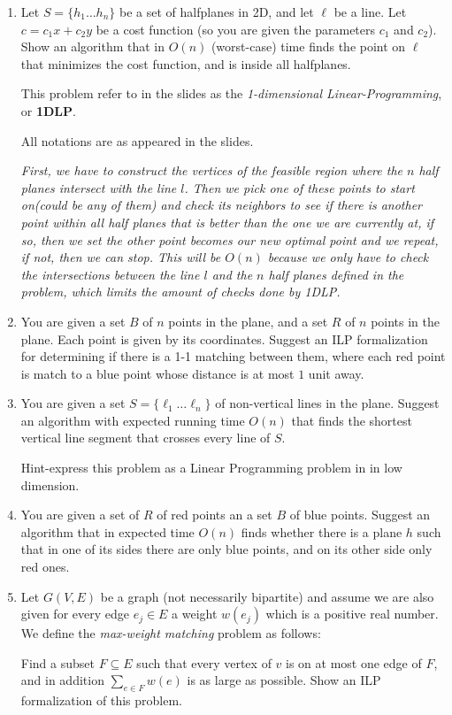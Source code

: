 \documentclass[11pt,epic,leqno,eepic,psfig,]{article}
\newcommand{\ans}[1]{{\color{brown}{\bf\Large Answer:} \sl  #1 \color{black}}}
\renewcommand{\i}{\item}
\begin{document}
\begin{enumerate}
\i Let $S=\{h_1\dots h_n\}$ be a set of halfplanes in 2D, and let $\ell$ be a line.
Let $c=c_1x+c_2y$ be a cost function (so you are given the parameters $c_1$ and $c_2$).
Show an algorithm that in $O(n)$ (worst-case) time finds the point on $\ell$ that minimizes the cost function, and is inside all halfplanes. 

This problem refer to in the slides as the {\em 1-dimensional Linear-Programming}, or  {\bf 1DLP}. 

All notations are as appeared in the slides. 

\ans{First, we have to construct the vertices of the feasible region where the $n$ half planes intersect with the line $l$. Then we pick one of these points to start on(could be any of them) and check its neighbors to see if there is another point within all half planes that is better than the one we are currently at, if so, then we set the other point becomes our new optimal point and we repeat, if not, then we can stop. This will be $O(n)$ because we only have to check the intersections between the line $l$ and the $n$ half planes defined in the problem, which limits the amount of checks done by 1DLP.}

\item You are given a set $B$ of $n$ points in the plane, and a set $R$ of $n$ points in the plane. Each point  is given by  its coordinates.  Suggest an ILP  formalization  for determining if there is a 1-1 matching between them, where each red point is match to a blue point whose distance is at most $1$ unit away.

\i You are given a set $S=\{\ell_1\dots \ell_n\}$ of non-vertical 
lines in the plane. Suggest an algorithm with expected running time $O(n)$  that finds the shortest vertical line segment that crosses every line of $S$. 

Hint-express this problem as a Linear Programming problem in  in low dimension.


\i You are given a set of $R$ of red points an a set $B$ of blue points. Suggest an algorithm that in expected time  $O(n)$ finds whether there is a plane $h$  such that in one of its sides there are only blue points, and on its other side only red ones. 


\i Let $G(V,E)$ be a graph (not necessarily bipartite) and assume we are also given for every edge $e_j\in E$ a weight $w(e_j )$ which is a positive real number. We define the {\em max-weight matching} problem as follows: 

Find a subset $F\subseteq E$ such that every vertex of $v$ is on at most one edge of $F$, and in addition $\sum_{e\in F} w(e)$ is as large as possible.  
 Show an ILP formalization of this problem. 


\end{enumerate}
\end{document}
